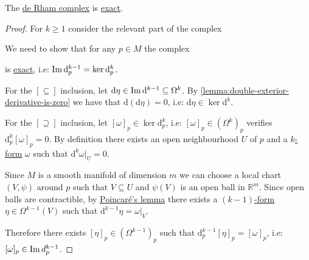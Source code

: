 \documentclass[../../main]{subfiles}
\begin{document}
\begin{lemma} \label{lemma:de-rham-complex-exact}
  The \hyperref[def:de-rham-complex]{de Rham complex} is \hyperref[def:exact-complex]{exact}.
\end{lemma}
\begin{proof}
  For \(k \geq 1\) consider the relevant part of the complex
  \begin{center}
  \end{center}
  We need to show that for any \(p \in M\) the complex
  \begin{center}
  \end{center}
  is \hyperref[def:exact-complex]{exact}, i.e: \(\operatorname*{Im} \mathrm{d}_{p}^{k-1} = \ker \mathrm{d}_{p}^{k}\).

  For the \([\subseteq]\) inclusion, let \(\mathrm{d}\eta \in \operatorname*{Im} \mathrm{d}^{k-1} \subseteq \Omega^{k}\). By \autoref{lemma:double-exterior-derivative-is-zero} we have that \(\mathrm{d}(\mathrm{d}\eta) = 0\), i.e: \(\mathrm{d}\eta \in \ker \mathrm{d}^{k}\).

  For the \([\supseteq]\) inclusion, let \([\omega]_{p} \in \ker \mathrm{d}_{p}^{k}\), i.e: \([\omega]_{p} \in \left( \Omega^{k} \right)_{p}\) verifies \(\mathrm{d}_{p}^{k}[\omega]_{p} = 0\).
  By definition there exists an open neighbourhood \(U\) of \(p\) and a \hyperref[def:smooth-k-form]{\(k\)-form} \(\omega\) such that \(\mathrm{d}^{k}\omega|_{U} = 0\).

  Since \(M\) is a smooth manifold of dimension \(m\) we can choose a local chart \((V, \psi)\) around \(p\) such that \(V \subseteq U\) and \(\psi(V)\) is an open ball in \(\mathbb{R}^{m}\).
  Since open balls are contractible, by \hyperref[lemma:poincare]{Poincaré's lemma} there exists a \hyperref[def:smooth-k-form]{\((k-1)\)-form} \(\eta \in \Omega^{k-1}(V)\) such that \(\mathrm{d}^{k-1}\eta = \omega|_{V}\).

  Therefore there exists \([\eta]_{p} \in \left( \Omega^{k-1} \right)_{p}\) such that \(\mathrm{d}_{p}^{k-1}[\eta]_{p} = [\omega]_{p}\), i.e: \([\omega]_{p} \in \operatorname*{Im} d_{p}^{k-1}\).
\end{proof}
\end{document}
